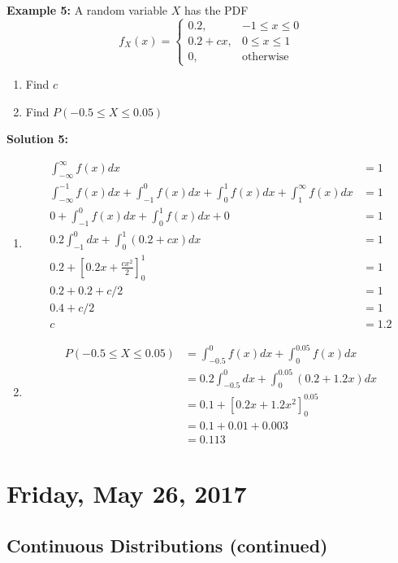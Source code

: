 \documentclass[12pt, twoside]{article}
\begin{document}
\textbf{Example 5:} A random variable $X$ has the PDF 
$$f_X (x) = 
\begin{cases}
	0.2, & -1 \leq x \leq 0\\
	0.2 + cx, & 0 \leq x \leq 1\\
	0, & \text{otherwise}
\end{cases}
$$
\begin{enumerate}
	\item{Find $c$}
	\item{Find $P(-0.5 \leq X \leq 0.05)$}
\end{enumerate}

\textbf{Solution 5:}
\begin{enumerate}
	\item{
	\begin{align*}
		\int_{-\infty}^{\infty} f(x) dx &= 1\\
		\int_{-\infty}^{-1} f(x) dx + \int_{-1}^{0} f(x) dx + \int_{0}^{1} f(x) dx + \int_{1}^{\infty} f(x) dx &= 1\\
		0 + \int_{-1}^{0} f(x) dx + \int_{0}^{1} f(x) dx + 0 &= 1\\
		0.2\int_{-1}^{0} dx + \int_{0}^{1} (0.2+cx) dx &= 1\\
		0.2 + [0.2x + \frac{cx^2}{2}]^{1}_{0} &= 1\\
		0.2 + 0.2 + c/2 &=1 \\
		0.4 + c/2 &= 1\\
		c &= 1.2
	\end{align*}
	}
	\item{
	\begin{align*}
		P(-0.5 \leq X \leq 0.05) &= \int_{-0.5}^{0} f(x) dx + \int_{0}^{0.05} f(x) dx\\
		&= 0.2 \int_{-0.5}^{0} dx + \int_{0}^{0.05} (0.2 + 1.2x) dx\\
		&= 0.1 + [0.2x + 1.2x^2]^{0.05}_{0}\\
		&= 0.1 + 0.01 + 0.003\\
		&= 0.113
	\end{align*}
	}
\end{enumerate}

\newpage

\section{Friday, May 26, 2017}

\subsection{Continuous Distributions (continued)}
\end{document}
